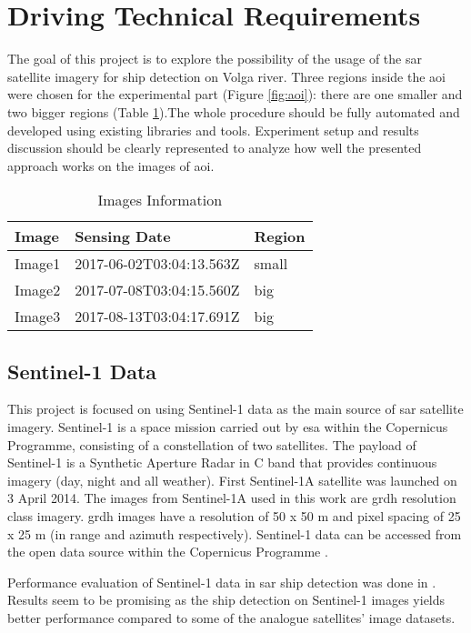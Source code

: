 \section{Driving Technical Requirements}

The goal of this project is to explore the possibility of the usage of the \gls{sar} satellite imagery for ship detection on Volga river. Three regions inside the \gls{aoi} were chosen for the experimental part (Figure \ref{fig:aoi}): there are one smaller and two bigger regions (Table \ref{table:1}).The whole procedure should be fully automated and developed using existing libraries and tools. Experiment setup and results discussion should be clearly represented to analyze how well the presented approach works on the images of \gls{aoi}.

\begin{table}[h!]
\centering
\begin{tabular}{|l|l|l|}
\hline
\textbf{Image} & \textbf{Sensing Date} & \textbf{Region} \\ 
\hline
Image1 & 2017-06-02T03:04:13.563Z & small \\
\hline
Image2 & 2017-07-08T03:04:15.560Z & big \\
\hline
Image3 & 2017-08-13T03:04:17.691Z & big \\
\hline
\end{tabular}
\caption{Images Information}
\label{table:1}
\end{table}

\subsection{Sentinel-1 Data}

This project is focused on using Sentinel-1 data as the main source of \gls{sar} satellite imagery. Sentinel-1 is a space mission carried out by \gls{esa} within the Copernicus Programme, consisting of a constellation of two satellites. The payload of Sentinel-1 is a Synthetic Aperture Radar in C band that provides continuous imagery (day, night and all weather). First Sentinel-1A satellite was launched on 3 April 2014. The images from Sentinel-1A used in this work are \gls{grdh} resolution class imagery. \gls{grdh} images have a resolution of 50 x 50 m and pixel spacing of 25 x 25 m (in range and azimuth respectively). Sentinel-1 data can be accessed from the open data source within the Copernicus Programme \cite{copernicus}.

Performance evaluation of Sentinel-1 data in \gls{sar} ship detection was done in \cite{sent_perf}. Results seem to be promising as the ship detection on Sentinel-1 images yields better performance compared to some of the analogue satellites' image datasets.
